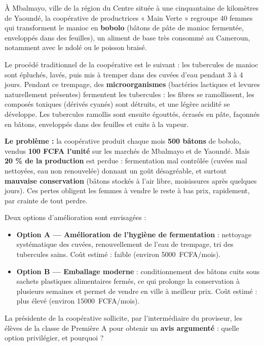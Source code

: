 \documentclass[11pt]{article}
\begin{document}
\begin{exemplebox}
À Mbalmayo, ville de la région du Centre située à une cinquantaine de kilomètres de Yaoundé, la coopérative de productrices « Main Verte » regroupe 40 femmes qui transforment le manioc en \textbf{bobolo} (bâtons de pâte de manioc fermentée, enveloppés dans des feuilles), un aliment de base très consommé au Cameroun, notamment avec le ndolé ou le poisson braisé.

Le procédé traditionnel de la coopérative est le suivant : les tubercules de manioc sont épluchés, lavés, puis mis à tremper dans des cuvées d'eau pendant 3 à 4 jours. Pendant ce trempage, des \textbf{microorganismes} (bactéries lactiques et levures naturellement présentes) fermentent les tubercules : les fibres se ramollissent, les composés toxiques (dérivés cyanés) sont détruits, et une légère acidité se développe. Les tubercules ramollis sont ensuite égouttés, écrasés en pâte, façonnés en bâtons, enveloppés dans des feuilles et cuits à la vapeur.

\textbf{Le problème :} la coopérative produit chaque mois \textbf{500 bâtons} de bobolo, vendus \textbf{100 FCFA l'unité} sur les marchés de Mbalmayo et de Yaoundé. Mais \textbf{20 \% de la production} est perdue : fermentation mal contrôlée (cuvées mal nettoyées, eau non renouvelée) donnant un goût désagréable, et surtout \textbf{mauvaise conservation} (bâtons stockés à l'air libre, moisissures après quelques jours). Ces pertes obligent les femmes à vendre le reste à bas prix, rapidement, par crainte de tout perdre.

Deux options d'amélioration sont envisagées :
\begin{itemize}
\item \textbf{Option A — Amélioration de l'hygiène de fermentation} : nettoyage systématique des cuvées, renouvellement de l'eau de trempage, tri des tubercules sains. Coût estimé : faible (environ \SI{5 000}{FCFA/mois}).
\item \textbf{Option B — Emballage moderne} : conditionnement des bâtons cuits sous sachets plastiques alimentaires fermés, ce qui prolonge la conservation à plusieurs semaines et permet de vendre en ville à meilleur prix. Coût estimé : plus élevé (environ \SI{15 000}{FCFA/mois}).
\end{itemize}

La présidente de la coopérative sollicite, par l'intermédiaire du proviseur, les élèves de la classe de Première A pour obtenir un \textbf{avis argumenté} : quelle option privilégier, et pourquoi ?
\end{exemplebox}
\end{document}

